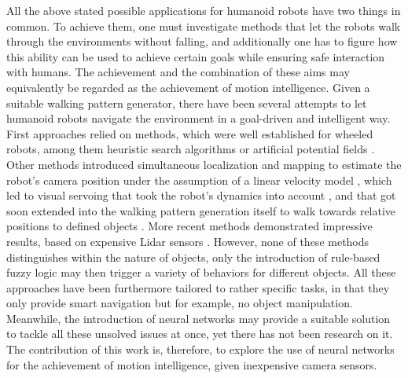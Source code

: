 All the above stated possible applications for humanoid robots have two things in common. To achieve them, one must investigate methods that let the robots walk through the environments without falling, and additionally one has to figure how this ability can be used to achieve certain goals while ensuring safe interaction with humans. The achievement and the combination of these aims may equivalently be regarded as the achievement of motion intelligence. Given a suitable walking pattern generator, there have been several attempts to let humanoid robots navigate the environment in a goal-driven and intelligent way. First approaches relied on methods, which were well established for wheeled robots, among them heuristic search algorithms or artificial potential fields \cite{kuffner2005motion}. Other methods introduced simultaneous localization and mapping to estimate the robot's camera position under the assumption of a linear velocity model \cite{stasse2008integrating}, which led to visual servoing that took the robot's dynamics into account \cite{dune2010cancelling}, and that got soon extended into the walking pattern generation itself to walk towards relative positions to defined objects \cite{dune2011vision}. More recent methods demonstrated impressive results, based on expensive Lidar sensors \cite{griffin2019footstep}. However, none of these methods distinguishes within the nature of objects, only the introduction of rule-based fuzzy logic \cite{dadios2012humanoid} may then trigger a variety of behaviors for different objects. All these approaches have been furthermore tailored to rather specific tasks, in that they only provide smart navigation but for example, no object manipulation. Meanwhile, the introduction of neural networks may provide a suitable solution to tackle all these unsolved issues at once, yet there has not been research on it. The contribution of this work is, therefore, to explore the use of neural networks for the achievement of motion intelligence, given inexpensive camera sensors.
\\\\
